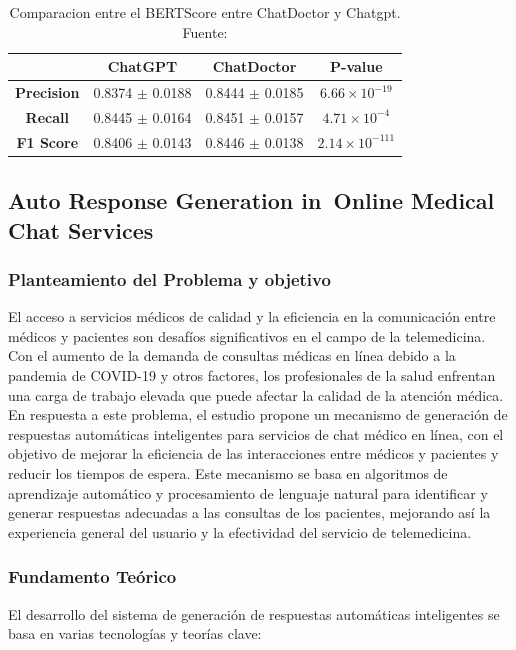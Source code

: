 		\begin{table}[h!]
			\centering
			\begin{tabular}{|c|c|c|c|}
				\hline
				& \textbf{ChatGPT} & \textbf{ChatDoctor} & \textbf{P-value} \\
				\hline
				\textbf{Precision} & 0.8374 $\pm$ 0.0188 & 0.8444 $\pm$ 0.0185 & $6.66 \times 10^{-19}$ \\
				\hline
				\textbf{Recall}    & 0.8445 $\pm$ 0.0164 & 0.8451 $\pm$ 0.0157 & $4.71 \times 10^{-4}$ \\
				\hline
				\textbf{F1 Score}   & 0.8406 $\pm$ 0.0143 & 0.8446 $\pm$ 0.0138 & $2.14 \times 10^{-111}$ \\
				\hline
			\end{tabular}
			\caption{Comparacion entre el BERTScore entre ChatDoctor y Chatgpt. Fuente: \cite{chatdoctor} }
		\end{table}

\subsection{Auto Response Generation in Online Medical Chat Services \citep*{AutoResponse-2022}}
	\subsubsection{Planteamiento del Problema y objetivo}
	El acceso a servicios médicos de calidad y la eficiencia en la comunicación entre médicos y pacientes son desafíos significativos en el campo de la telemedicina. Con el aumento de la demanda de consultas médicas en línea debido a la pandemia de COVID-19 y otros factores, los profesionales de la salud enfrentan una carga de trabajo elevada que puede afectar la calidad de la atención médica. En respuesta a este problema, el estudio propone un mecanismo de generación de respuestas automáticas inteligentes para servicios de chat médico en línea, con el objetivo de mejorar la eficiencia de las interacciones entre médicos y pacientes y reducir los tiempos de espera. Este mecanismo se basa en algoritmos de aprendizaje automático y procesamiento de lenguaje natural para identificar y generar respuestas adecuadas a las consultas de los pacientes, mejorando así la experiencia general del usuario y la efectividad del servicio de telemedicina.
	
	\subsubsection{Fundamento Teórico}
	El desarrollo del sistema de generación de respuestas automáticas inteligentes se basa en varias tecnologías y teorías clave:
		
